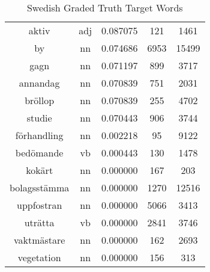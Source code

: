 \begin{table}
\begin{tabular}{ccccc}
aktiv            & adj           & 0.087075           & 121                & 1461                \\
by               & nn            & 0.074686           & 6953               & 15499               \\
gagn             & nn            & 0.071197           & 899                & 3717                \\
annandag         & nn            & 0.070839           & 751                & 2031                \\
bröllop          & nn            & 0.070839           & 255                & 4702                \\
studie           & nn            & 0.070443           & 906                & 3744                \\
förhandling      & nn            & 0.002218           & 95                 & 9122                \\
bedömande        & vb            & 0.000443           & 130                & 1478                \\
kokärt           & nn            & 0.000000           & 167                & 203                 \\
bolagsstämma     & nn            & 0.000000           & 1270               & 12516               \\
uppfostran       & nn            & 0.000000           & 5066               & 3413                \\
uträtta          & vb            & 0.000000           & 2841               & 3746                \\
vaktmästare      & nn            & 0.000000           & 162                & 2693                \\
vegetation       & nn            & 0.000000           & 156                & 313                 \\
\bottomrule
\end{tabular}
\caption{Swedish Graded Truth Target Words}
\label{tab:sve-truthtargets}
\end{table}











